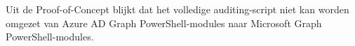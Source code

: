 Uit de Proof-of-Concept blijkt dat het volledige auditing-script niet kan worden omgezet van Azure \ac{AD} Graph PowerShell-modules naar Microsoft Graph PowerShell-modules. 




